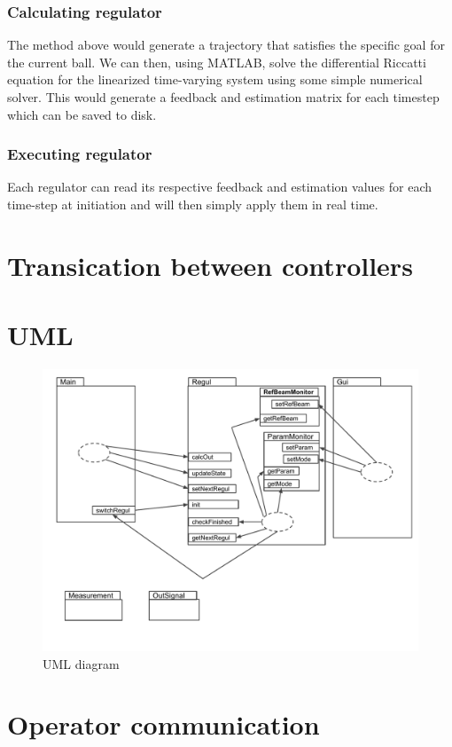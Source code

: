 \documentclass{article}
\begin{document}
\subsubsection{Calculating regulator}
The method above would generate a trajectory that satisfies the specific goal for the current ball. We can then, using MATLAB, solve the differential Riccatti equation for the linearized time-varying system using some simple numerical solver. This would generate a feedback and estimation matrix for each timestep which can be saved to disk.
\subsubsection{Executing regulator}
Each regulator can read its respective feedback and estimation values for each time-step at initiation and will then simply apply them in real time.

\section{Transication between controllers}


\section{UML}
\begin{figure}[htbp]
  \centering
  \includegraphics[width=\textwidth]{UML}
  \caption{UML diagram}\label{fig:UML}
\end{figure}

\section{Operator communication}
\end{document}
